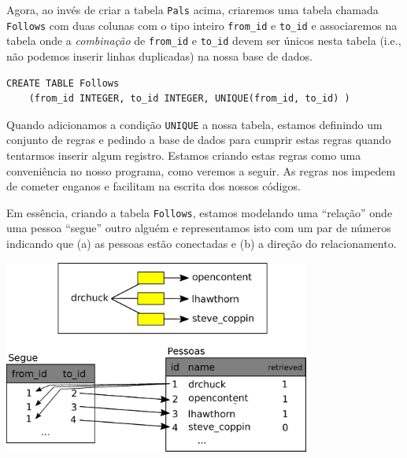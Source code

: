 
Agora, ao invés de criar a tabela {\tt Pals} acima, criaremos uma tabela
chamada {\tt Follows} com duas colunas com o tipo inteiro \verb"from_id" e
\verb"to_id" e associaremos na tabela onde a \emph{combinação} de
\verb"from_id" e \verb"to_id" devem ser únicos nesta tabela (i.e., não podemos
inserir linhas duplicadas) na nossa base de dados.

\beforeverb
\begin{verbatim}
CREATE TABLE Follows 
    (from_id INTEGER, to_id INTEGER, UNIQUE(from_id, to_id) )
\end{verbatim}
\afterverb
%

Quando adicionamos a condição {\tt UNIQUE} a nossa tabela, estamos definindo
um conjunto de regras e pedindo a base de dados para cumprir estas regras
quando tentarmos inserir algum registro. Estamos criando estas regras como uma
conveniência no nosso programa, como veremos a seguir. As regras nos impedem de
cometer enganos e facilitam na escrita dos nossos códigos.


Em essência, criando a tabela {\tt Follows}, estamos modelando uma ``relação''
onde uma pessoa ``segue'' outro alguém e representamos isto com um par de
números indicando que (a) as pessoas estão conectadas e (b) a direção do
relacionamento.

\beforefig
\centerline{\includegraphics[height=2.50in]{figs2/twitter.eps}}
\afterfig



